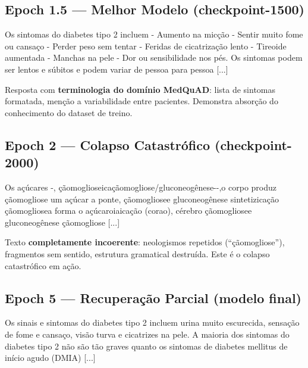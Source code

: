 \subsection{Epoch 1.5 --- Melhor Modelo (checkpoint-1500)}

\begin{tcolorbox}[colback=blue!3, colframe=blue!60, fontupper=\small\ttfamily]
Os sintomas do diabetes tipo 2 incluem - Aumento na micção - Sentir muito fome ou cansaço - Perder peso sem tentar - Feridas de cicatrização lento - Tireoide aumentada - Manchas na pele - Dor ou sensibilidade nos pés. Os sintomas podem ser lentos e súbitos e podem variar de pessoa para pessoa [...]
\end{tcolorbox}

Resposta com \textbf{terminologia do domínio MedQuAD}: lista de sintomas formatada, menção a variabilidade entre pacientes. Demonstra absorção do conhecimento do dataset de treino.

\subsection{Epoch 2 --- Colapso Catastrófico (checkpoint-2000)}

\begin{tcolorbox}[colback=red!3, colframe=red!60, fontupper=\small\ttfamily]
Os açúcares -, çãomoglioseicaçãomogliose/gluconeogênese-{}-,o corpo produz çãomogliose um açúcar a ponte, çãomogliosee gluconeogênese sintetizicação çãomogliosea forma o açúcaroiaicação (corao), cérebro çãomogliosee gluconeogênese çãomogliose [...]
\end{tcolorbox}

Texto \textbf{completamente incoerente}: neologismos repetidos (``çãomogliose''), fragmentos sem sentido, estrutura gramatical destruída. Este é o colapso catastrófico em ação.

\subsection{Epoch 5 --- Recuperação Parcial (modelo final)}

\begin{tcolorbox}[colback=green!3, colframe=green!60, fontupper=\small\ttfamily]
Os sinais e sintomas do diabetes tipo 2 incluem urina muito escurecida, sensação de fome e cansaço, visão turva e cicatrizes na pele. A maioria dos sintomas do diabetes tipo 2 não são tão graves quanto os sintomas de diabetes mellitus de início agudo (DMIA) [...]
\end{tcolorbox}

